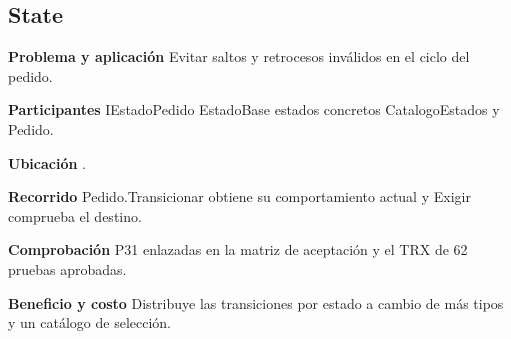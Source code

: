 \noindent\begin{minipage}{\linewidth}
\subsection{State}
\textbf{Problema y aplicación} Evitar saltos y retrocesos inválidos en el ciclo del pedido.

\textbf{Participantes} IEstadoPedido EstadoBase estados concretos CatalogoEstados y Pedido.

\textbf{Ubicación} \href{https://github.com/Alan77-bot/LogiMarket360Alan/blob/68bda51063441415524ede51bdf61649ee9b4973/LogiMarket.Domain/Estados/EstadoBase.cs#L5}{}.

\textbf{Recorrido} Pedido.Transicionar obtiene su comportamiento actual y Exigir comprueba el destino.


\textbf{Comprobación} P31 enlazadas en la matriz de aceptación y el TRX de 62 pruebas aprobadas.

\textbf{Beneficio y costo} Distribuye las transiciones por estado a cambio de más tipos y un catálogo de selección.

\end{minipage}\par\smallskip
